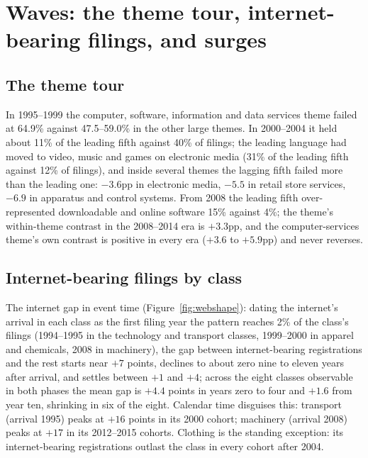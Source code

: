 \section{Waves: the theme tour, internet-bearing filings, and surges}\label{supp:waves}

\subsection{The theme tour}

In 1995--1999 the computer, software, information and data services theme
failed at 64.9\% against 47.5--59.0\% in the other large themes. In
2000--2004 it held about 11\% of the leading fifth against 40\% of
filings; the leading language had moved to video, music and games on
electronic media (31\% of the leading fifth against 12\% of filings), and
inside several themes the lagging fifth failed more than the leading one:
$-3.6$pp in electronic media, $-5.5$ in retail store services, $-6.9$ in
apparatus and control systems. From 2008 the leading fifth
over-represented downloadable and online software 15\% against 4\%; the
theme's within-theme contrast in the 2008--2014 era is $+3.3$pp, and the
computer-services theme's own contrast is positive in every era ($+3.6$
to $+5.9$pp) and never reverses.

\subsection{Internet-bearing filings by class}

\begin{table}[!htbp]\centering\footnotesize
\caption{Internet-bearing filings against the rest of their Nice class
(Section~\ref{sec:internet}). Registration is the share of class-records
filed 1995--2018 that reached registration; failure is the share of
unique registrations 2002--2018 cancelled for non-use at age 4.0--8.5
years. Classes with fewer than 500 internet-bearing registrations are
omitted.}
\label{tab:internetS}

\end{table}

The internet gap in event time (Figure~\ref{fig:webshape}): dating the
internet's arrival in each class as the first filing year the pattern
reaches 2\% of the class's filings (1994--1995 in the technology and
transport classes, 1999--2000 in apparel and chemicals, 2008 in
machinery), the gap between internet-bearing registrations and the rest
starts near $+7$ points, declines to about zero nine to eleven years
after arrival, and settles between $+1$ and $+4$; across the eight
classes observable in both phases the mean gap is $+4.4$ points in years
zero to four and $+1.6$ from year ten, shrinking in six of the eight.
Calendar time disguises this: transport (arrival 1995) peaks at $+16$
points in its 2000 cohort; machinery (arrival 2008) peaks at $+17$ in its
2012--2015 cohorts. Clothing is the standing exception: its
internet-bearing registrations outlast the class in every cohort after
2004.

